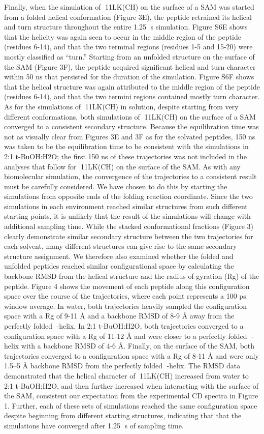 Finally, when the simulation of 11LK(CH) on the surface of a SAM was started from a folded helical conformation (Figure 3E), the peptide retrained its helical and turn structure throughout the entire 1.25 s simulation. Figure S6E shows that the helicity was again seen to occur in the middle region of the peptide (residues 6-14), and that the two terminal regions (residues 1-5 and 15-20) were mostly classified as “turn.” Starting from an unfolded structure on the surface of the SAM (Figure 3F), the peptide acquired significant helical and turn character within 50 ns that persisted for the duration of the simulation. Figure S6F shows that the helical structure was again attributed to the middle region of the peptide (residues 6-14), and that the two termini regions contained mostly turn character. As for the simulations of 11LK(CH) in solution, despite starting from very different conformations, both simulations of 11LK(CH) on the surface of a SAM converged to a consistent secondary structure. Because the equilibration time was not as visually clear from Figures 3E and 3F as for the solvated peptides, 150 ns was taken to be the equilibration time to be consistent with the simulations in 2:1 t-BuOH:H2O; the first 150 ns of these trajectories was not included in the analyses that follow for 11LK(CH) on the surface of the SAM.
As with any biomolecular simulation, the convergence of the trajectories to a consistent result must be carefully considered. We have chosen to do this by starting the simulations from opposite ends of the folding reaction coordinate. Since the two simulations in each environment reached similar structures from such different starting points, it is unlikely that the result of the simulations will change with additional sampling time. While the stacked conformational fractions (Figure 3) clearly demonstrate similar secondary structure between the two trajectories for each solvent, many different structures can give rise to the same secondary structure assignment. We therefore also examined whether the folded and unfolded peptides reached similar configurational space by calculating the backbone RMSD from the helical structure and the radius of gyration (Rg) of the peptide. Figure 4 shows the movement of each peptide along this configuration space over the course of the trajectories, where each point represents a 100 ps window average. In water, both trajectories heavily sampled the configuration space with a Rg of 9-11 Å and a backbone RMSD of 8-9 Å away from the perfectly folded -helix. In 2:1 t-BuOH:H2O, both trajectories converged to a configuration space with a Rg of 11-12 Å and were closer to a perfectly folded -helix with a backbone RMSD of 4-6 Å. Finally, on the surface of the SAM, both trajectories converged to a configuration space with a Rg of 8-11 Å and were only 1.5–5 Å backbone RMSD from the perfectly folded -helix. The RMSD data demonstrated that the helical character of 11LK(CH) increased from water to 2:1 t-BuOH:H2O, and then further increased when interacting with the surface of the SAM, consistent our expectation from the experimental CD spectra in Figure 1. Further, each of these sets of simulations reached the same configuration space despite beginning from different starting structures, indicating that that the simulations have converged after 1.25 s of sampling time.
